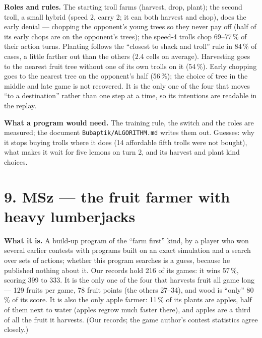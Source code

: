 \documentclass[10pt,a4paper]{article}
\newcommand{\src}[1]{{\small\color{muted}#1}}
\begin{document}
\textbf{Roles and rules.} The starting troll farms (harvest, drop, plant); the second troll, a small hybrid (speed 2, carry 2; it can both harvest and chop), does the early denial --- chopping the opponent's young trees so they never pay off (half of its early chops are on the opponent's trees); the speed-4 trolls chop 69--77\,\% of their action turns. Planting follows the ``closest to shack and troll'' rule in 84\,\% of cases, a little farther out than the others (2.4 cells on average). Harvesting goes to the nearest fruit tree without one of its own trolls on it (54\,\%). Early chopping goes to the nearest tree on the opponent's half (56\,\%); the choice of tree in the middle and late game is not recovered. It is the only one of the four that moves ``to a destination'' rather than one step at a time, so its intentions are readable in the replay.

\textbf{What a program would need.} The training rule, the switch and the roles are measured; the document \texttt{Bubaptik/ALGORITHM.md} writes them out. Guesses: why it stops buying trolls where it does (14 affordable fifth trolls were not bought), what makes it wait for five lemons on turn 2, and its harvest and plant kind choices.

\section*{9. MSz --- the fruit farmer with heavy lumberjacks}

\textbf{What it is.} A build-up program of the ``farm first'' kind, by a player who won several earlier contests with programs built on an exact simulation and a search over sets of actions; whether this program searches is a guess, because he published nothing about it. Our records hold 216 of its games: it wins 57\,\%, scoring 399 to 333. It is the only one of the four that harvests fruit all game long --- 129 fruits per game, 78 fruit points (the others 27--34), and wood is ``only'' 80\,\% of its score. It is also the only apple farmer: 11\,\% of its plants are apples, half of them next to water (apples regrow much faster there), and apples are a third of all the fruit it harvests. \src{(Our records; the game author's contest statistics agree closely.)}
\end{document}
